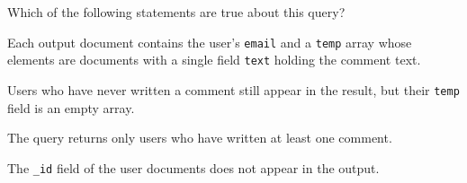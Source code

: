 \documentclass[12pt,answers]{exam}
\begin{document}
\begin{questions}
\begin{minipage}{\linewidth}
Which of the following statements are true about this query?

\begin{checkboxes}
    \CorrectChoice Each output document contains the user's \texttt{email} and a
    \texttt{temp} array whose elements are documents with a single
    field \texttt{text} holding the comment text.

    \CorrectChoice Users who have never written a comment still appear in the
    result, but their \texttt{temp} field is an empty array.

    \choice The query returns only users who have written at least one comment.

    \CorrectChoice The \texttt{\_id} field of the user documents does not appear
    in the output.
\end{checkboxes}
\end{minipage}












\end{questions}
\end{document}
